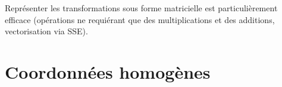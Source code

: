 \documentclass[compress]{beamer}
\begin{document}
\begin{frame}{}

    Représenter les transformations sous forme matricielle est particulièrement
    efficace (opérations ne requiérant que des multiplications et des additions,
    vectorisation via SSE).


\end{frame}



\section{Coordonnées homogènes}
\end{document}
